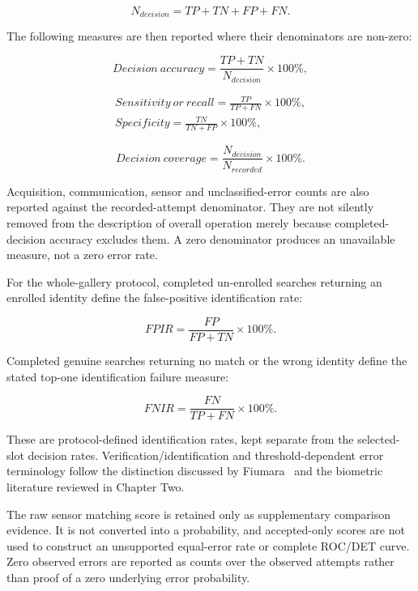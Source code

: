 \begin{equation}
N_{decision}=TP+TN+FP+FN.
\end{equation}

The following measures are then reported where their denominators are non-zero:

\begin{equation}
Decision\ accuracy=\frac{TP+TN}{N_{decision}}\times100\%,
\end{equation}

\begin{equation}
\begin{gathered}
Sensitivity\ or\ recall=\frac{TP}{TP+FN}\times100\%,
\\
Specificity=\frac{TN}{TN+FP}\times100\%,
\end{gathered}
\end{equation}

\begin{equation}
Decision\ coverage=\frac{N_{decision}}{N_{recorded}}\times100\%.
\end{equation}

Acquisition, communication, sensor and unclassified-error counts are also reported against the recorded-attempt denominator. They are not silently removed from the description of overall operation merely because completed-decision accuracy excludes them. A zero denominator produces an unavailable measure, not a zero error rate.

For the whole-gallery protocol, completed un-enrolled searches returning an enrolled identity define the false-positive identification rate:

\begin{equation}
FPIR=\frac{FP}{FP+TN}\times100\%.
\end{equation}

Completed genuine searches returning no match or the wrong identity define the stated top-one identification failure measure:

\begin{equation}
FNIR=\frac{FN}{TP+FN}\times100\%.
\end{equation}

These are protocol-defined identification rates, kept separate from the selected-slot decision rates. Verification/identification and threshold-dependent error terminology follow the distinction discussed by Fiumara~\cite{fiumara2022} and the biometric literature reviewed in Chapter Two.

The raw sensor matching score is retained only as supplementary comparison evidence. It is not converted into a probability, and accepted-only scores are not used to construct an unsupported equal-error rate or complete ROC/DET curve. Zero observed errors are reported as counts over the observed attempts rather than proof of a zero underlying error probability.

